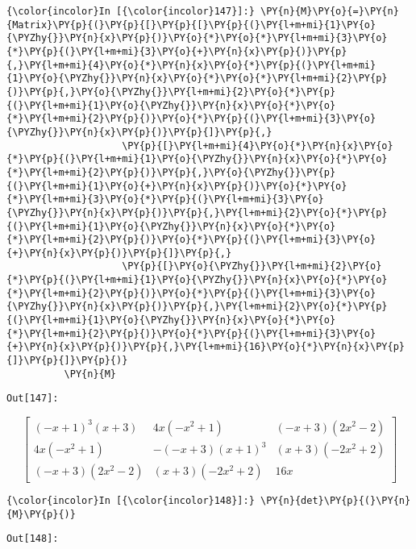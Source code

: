     \begin{Verbatim}[commandchars=\\\{\}]
{\color{incolor}In [{\color{incolor}147}]:} \PY{n}{M}\PY{o}{=}\PY{n}{Matrix}\PY{p}{(}\PY{p}{[}\PY{p}{[}\PY{p}{(}\PY{l+m+mi}{1}\PY{o}{\PYZhy{}}\PY{n}{x}\PY{p}{)}\PY{o}{*}\PY{o}{*}\PY{l+m+mi}{3}\PY{o}{*}\PY{p}{(}\PY{l+m+mi}{3}\PY{o}{+}\PY{n}{x}\PY{p}{)}\PY{p}{,}\PY{l+m+mi}{4}\PY{o}{*}\PY{n}{x}\PY{o}{*}\PY{p}{(}\PY{l+m+mi}{1}\PY{o}{\PYZhy{}}\PY{n}{x}\PY{o}{*}\PY{o}{*}\PY{l+m+mi}{2}\PY{p}{)}\PY{p}{,}\PY{o}{\PYZhy{}}\PY{l+m+mi}{2}\PY{o}{*}\PY{p}{(}\PY{l+m+mi}{1}\PY{o}{\PYZhy{}}\PY{n}{x}\PY{o}{*}\PY{o}{*}\PY{l+m+mi}{2}\PY{p}{)}\PY{o}{*}\PY{p}{(}\PY{l+m+mi}{3}\PY{o}{\PYZhy{}}\PY{n}{x}\PY{p}{)}\PY{p}{]}\PY{p}{,}
                    \PY{p}{[}\PY{l+m+mi}{4}\PY{o}{*}\PY{n}{x}\PY{o}{*}\PY{p}{(}\PY{l+m+mi}{1}\PY{o}{\PYZhy{}}\PY{n}{x}\PY{o}{*}\PY{o}{*}\PY{l+m+mi}{2}\PY{p}{)}\PY{p}{,}\PY{o}{\PYZhy{}}\PY{p}{(}\PY{l+m+mi}{1}\PY{o}{+}\PY{n}{x}\PY{p}{)}\PY{o}{*}\PY{o}{*}\PY{l+m+mi}{3}\PY{o}{*}\PY{p}{(}\PY{l+m+mi}{3}\PY{o}{\PYZhy{}}\PY{n}{x}\PY{p}{)}\PY{p}{,}\PY{l+m+mi}{2}\PY{o}{*}\PY{p}{(}\PY{l+m+mi}{1}\PY{o}{\PYZhy{}}\PY{n}{x}\PY{o}{*}\PY{o}{*}\PY{l+m+mi}{2}\PY{p}{)}\PY{o}{*}\PY{p}{(}\PY{l+m+mi}{3}\PY{o}{+}\PY{n}{x}\PY{p}{)}\PY{p}{]}\PY{p}{,}
                    \PY{p}{[}\PY{o}{\PYZhy{}}\PY{l+m+mi}{2}\PY{o}{*}\PY{p}{(}\PY{l+m+mi}{1}\PY{o}{\PYZhy{}}\PY{n}{x}\PY{o}{*}\PY{o}{*}\PY{l+m+mi}{2}\PY{p}{)}\PY{o}{*}\PY{p}{(}\PY{l+m+mi}{3}\PY{o}{\PYZhy{}}\PY{n}{x}\PY{p}{)}\PY{p}{,}\PY{l+m+mi}{2}\PY{o}{*}\PY{p}{(}\PY{l+m+mi}{1}\PY{o}{\PYZhy{}}\PY{n}{x}\PY{o}{*}\PY{o}{*}\PY{l+m+mi}{2}\PY{p}{)}\PY{o}{*}\PY{p}{(}\PY{l+m+mi}{3}\PY{o}{+}\PY{n}{x}\PY{p}{)}\PY{p}{,}\PY{l+m+mi}{16}\PY{o}{*}\PY{n}{x}\PY{p}{]}\PY{p}{]}\PY{p}{)}
          \PY{n}{M}
\end{Verbatim}
\texttt{\color{outcolor}Out[{\color{outcolor}147}]:}
    
    \[\left[\begin{matrix}\left(- x + 1\right)^{3} \left(x + 3\right) & 4 x \left(- x^{2} + 1\right) & \left(- x + 3\right) \left(2 x^{2} - 2\right)\\4 x \left(- x^{2} + 1\right) & - \left(- x + 3\right) \left(x + 1\right)^{3} & \left(x + 3\right) \left(- 2 x^{2} + 2\right)\\\left(- x + 3\right) \left(2 x^{2} - 2\right) & \left(x + 3\right) \left(- 2 x^{2} + 2\right) & 16 x\end{matrix}\right]\]

    

    \begin{Verbatim}[commandchars=\\\{\}]
{\color{incolor}In [{\color{incolor}148}]:} \PY{n}{det}\PY{p}{(}\PY{n}{M}\PY{p}{)}
\end{Verbatim}
\texttt{\color{outcolor}Out[{\color{outcolor}148}]:}
    
